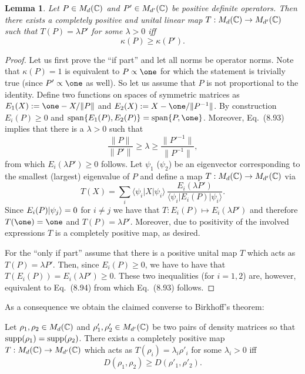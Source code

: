 \documentclass[11pt,a4paper]{article}
\theoremstyle{plain}
\newtheorem{lemma}{Lemma}[section]
\theoremstyle{definition}
\theoremstyle{remark}
\begin{document}
\begin{lemma}
    Let $P\in M_d(\mathbb{C})$ and $P'\in M_{d'}(\mathbb{C})$ be positive definite operators. Then there exists a completely positive and unital linear map
    $T:M_d(\mathbb{C})\to M_{d'}(\mathbb{C})$ such that $T(P)=\lambda P'$ for some $\lambda>0$ iff
    \begin{equation}\tag{8.93}
        \kappa(P) \ge \kappa(P').
    \end{equation}
\end{lemma}

\begin{proof}
    Let us first prove the ``if part'' and let all norms be operator norms. Note that $\kappa(P)=1$ is equivalent to $P\propto\one$ for which the statement is trivially true
    (since $P'\propto\one$ as well). So let us assume that $P$ is not proportional to the identity. Define two functions on spaces of symmetric matrices as
    $E_1(X):=\one - X/\|P\|$ and $E_2(X):=X-\one/\|P^{-1}\|$. By construction $E_i(P)\ge 0$ and $\spn\{E_1(P),E_2(P)\}=\spn\{P,\one\}$.
    Moreover, Eq.~(8.93) implies that there is a $\lambda>0$ such that
    \begin{equation}\tag{8.94}
        \frac{\|P\|}{\|P'\|} \ge \lambda \ge \frac{\|{P'}^{-1}\|}{\|P^{-1}\|},
    \end{equation}
    from which $E_i(\lambda P')\ge 0$ follows. Let $\psi_1$ ($\psi_2$) be an eigenvector corresponding to the smallest (largest) eigenvalue of $P$ and define a map
    $T:M_d(\mathbb{C})\to M_{d'}(\mathbb{C})$ via
    \begin{equation}\tag{8.95}
        T(X) = \sum_i \langle\psi_i|X|\psi_i\rangle\,\frac{E_i(\lambda P')}{\langle\psi_i|E_i(P)|\psi_i\rangle}.
    \end{equation}
    Since $E_i(P)|\psi_j\rangle=0$ for $i\neq j$ we have that $T:E_i(P)\mapsto E_i(\lambda P')$ and therefore $T(\one)=\one$ and $T(P)=\lambda P'$.
    Moreover, due to positivity of the involved expressions $T$ is a completely positive map, as desired.

    For the ``only if part'' assume that there is a positive unital map $T$ which acts as $T(P)=\lambda P'$. Then, since $E_i(P)\ge 0$, we have to have that
    $T(E_i(P)) = E_i(\lambda P')\ge 0$. These two inequalities (for $i=1,2$) are, however, equivalent to Eq.~(8.94) from which Eq.~(8.93) follows.
\end{proof}

As a consequence we obtain the claimed converse to Birkhoff's theorem:

\begin{theorem}
    Let $\rho_1,\rho_2\in M_d(\mathbb{C})$ and $\rho'_1,\rho'_2\in M_{d'}(\mathbb{C})$ be two pairs of density matrices so that $\operatorname{supp}(\rho_1)=\operatorname{supp}(\rho_2)$.
    There exists a completely positive map $T:M_d(\mathbb{C})\to M_{d'}(\mathbb{C})$ which acts as $T(\rho_i)=\lambda_i\rho'_i$ for some $\lambda_i>0$ iff
    \begin{equation}\tag{8.96}
        D(\rho_1,\rho_2)\ge D(\rho'_1,\rho'_2).
    \end{equation}
\end{theorem}
\end{document}
